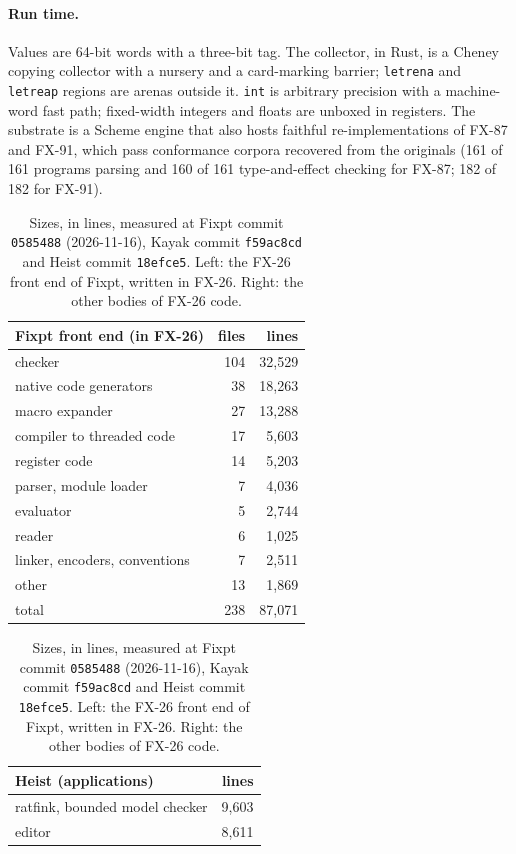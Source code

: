 \documentclass[acmsmall,screen,review]{acmart}
\newcommand{\cd}[1]{\texttt{#1}}
\newcommand{\fx}{FX-26}
\begin{document}
\paragraph{Run time.} Values are 64-bit words with a three-bit tag.
The collector, in Rust, is a Cheney copying collector with a nursery
and a card-marking barrier; \cd{letrena} and \cd{letreap} regions are
arenas outside it. \cd{int} is arbitrary precision with a machine-word fast
path; fixed-width integers and floats are unboxed in registers. The
substrate is a Scheme engine that also hosts faithful
re-implementations of FX-87 and FX-91, which pass conformance corpora
recovered from the originals (161 of 161 programs parsing and 160 of
161 type-and-effect checking for FX-87; 182 of 182 for FX-91).

\begin{table}[t]
\caption{Sizes, in lines, measured at Fixpt commit \cd{0585488}
(2026-11-16), Kayak commit \cd{f59ac8cd} and Heist commit \cd{18efce5}.
Left: the \fx{} front end of Fixpt, written in \fx. Right: the other
bodies of \fx{} code.}
\label{tab:sizes}
\small
\begin{minipage}[t]{0.48\linewidth}
\begin{tabular}{@{}lrr@{}}
\toprule
Fixpt front end (in \fx) & files & lines\\
\midrule
checker & 104 & 32,529\\
native code generators & 38 & 18,263\\
macro expander & 27 & 13,288\\
compiler to threaded code & 17 & 5,603\\
register code & 14 & 5,203\\
parser, module loader & 7 & 4,036\\
evaluator & 5 & 2,744\\
reader & 6 & 1,025\\
linker, encoders, conventions & 7 & 2,511\\
other & 13 & 1,869\\
\midrule
total & 238 & 87,071\\
\bottomrule
\end{tabular}
\end{minipage}\hfill
\begin{minipage}[t]{0.48\linewidth}
\begin{tabular}{@{}lr@{}}
\toprule
Heist (applications) & lines\\
\midrule
ratfink, bounded model checker & 9,603\\
editor & 8,611\\

\end{tabular}
\end{minipage}
\end{table}
\end{document}
